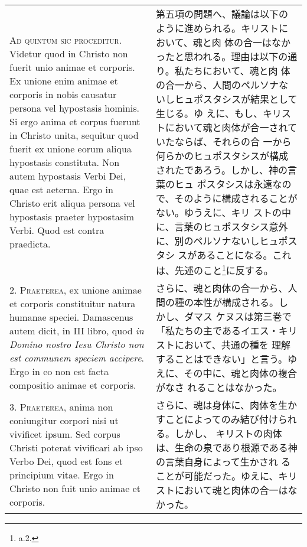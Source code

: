 \documentclass[10pt]{jsarticle} %
\begin{document}
\begin{longtable}{p{21em}p{21em}}


{\Huge A}{\scshape d quintum sic proceditur}. Videtur quod in Christo
non fuerit unio animae et corporis. Ex unione enim animae et corporis
in nobis causatur persona vel hypostasis hominis. Si ergo anima et
corpus fuerunt in Christo unita, sequitur quod fuerit ex unione eorum
aliqua hypostasis constituta. Non autem hypostasis Verbi Dei, quae est
aeterna. Ergo in Christo erit aliqua persona vel hypostasis praeter
hypostasim Verbi. Quod est contra praedicta.


&

第五項の問題へ、議論は以下のように進められる。キリストにおいて、魂と肉
体の合一はなかったと思われる。理由は以下の通り。私たちにおいて、魂と肉
体の合一から、人間のペルソナないしヒュポスタシスが結果として生じる。ゆ
えに、もし、キリストにおいて魂と肉体が合一されていたならば、それらの合
一から何らかのヒュポスタシスが構成されたであろう。しかし、神の言葉のヒュ
ポスタシスは永遠なので、そのように構成されることがない。ゆうえに、キリ
ストの中に、言葉のヒュポスタシス意外に、別のペルソナないしヒュポスタシ
スがあることになる。これは、先述のこと\footnote{a.2.}に反する。


\\



2. {\scshape Praeterea}, ex unione animae et corporis constituitur
natura humanae speciei. Damascenus autem dicit, in III libro, quod
{\itshape in Domino nostro Iesu Christo non est communem speciem
accipere}. Ergo in eo non est facta compositio animae et corporis.


&


さらに、魂と肉体の合一から、人間の種の本性が構成される。しかし、ダマス
ケヌスは第三巻で「私たちの主であるイエス・キリストにおいて、共通の種を
理解することはできない」と言う。ゆえに、その中に、魂と肉体の複合がなさ
れることはなかった。

\\



3. {\scshape Praeterea}, anima non coniungitur corpori nisi ut
vivificet ipsum. Sed corpus Christi poterat vivificari ab ipso Verbo
Dei, quod est fons et principium vitae. Ergo in Christo non fuit unio
animae et corporis.


&


さらに、魂は身体に、肉体を生かすことによってのみ結び付けられる。しかし、
キリストの肉体は、生命の泉であり根源である神の言葉自身によって生かされ
ることが可能だった。ゆえに、キリストにおいて魂と肉体の合一はなかった。



\end{longtable}
\end{document}

